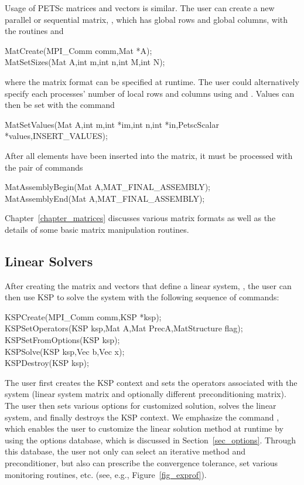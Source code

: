 Usage of PETSc matrices and vectors is similar.  
The user can create a new parallel or sequential matrix, , which
has  global rows and  global columns, with the routines
 and 
\begin{tabbing}
  MatCreate(MPI\_Comm comm,Mat *A);\\
  MatSetSizes(Mat A,int m,int n,int M,int N);
\end{tabbing}
where the matrix format can be specified at runtime.  The user could
alternatively specify each processes' number of local rows and columns
using  and .
Values can then be set with the command
\begin{tabbing}
  MatSetValues(Mat A,int m,int *im,int n,int *in,PetscScalar *values,INSERT\_VALUES);
\end{tabbing}
After  all elements have been inserted into the
matrix, it must be processed with the pair of commands
 
\begin{tabbing}
  MatAssemblyBegin(Mat A,MAT\_FINAL\_ASSEMBLY);\\
  MatAssemblyEnd(Mat A,MAT\_FINAL\_ASSEMBLY);
\end{tabbing}
Chapter~\ref{chapter_matrices} discusses various matrix formats as
well as the details of some basic matrix manipulation routines.

\subsection*{Linear Solvers}

After creating the matrix and vectors that define a linear system,
, the user can then use KSP to solve the system 
with the following sequence of commands: 
 
  
\begin{tabbing}
  KSPCreate(MPI\_Comm comm,KSP *ksp); \\
  KSPSetOperators(KSP ksp,Mat A,Mat PrecA,MatStructure flag);\\
  KSPSetFromOptions(KSP ksp);\\
  KSPSolve(KSP ksp,Vec b,Vec x);\\
  KSPDestroy(KSP ksp);
\end{tabbing}
The user first creates the KSP context and sets the operators
associated with the system (linear system matrix and optionally different
preconditioning matrix).  The user then sets various options for
customized solution, solves the linear system, and finally destroys
the KSP context.  We emphasize the command , 
which enables the user to customize the linear solution
method at runtime by using the options database, which is discussed in
Section~\ref{sec_options}. Through this database, the user not only
can select an iterative method and preconditioner, but also can prescribe
the convergence tolerance, set various monitoring routines, etc.
(see, e.g., Figure~\ref{fig_exprof}).

